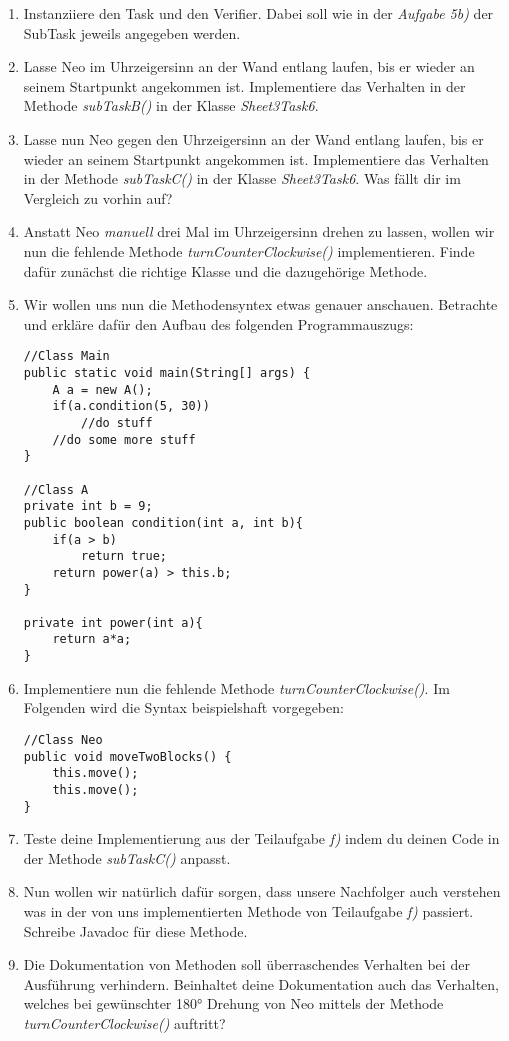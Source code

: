 
\begin{enumerate}[label=\alph*)]
    \item Instanziiere den Task und den Verifier. Dabei soll wie in der \textit{Aufgabe 5b)} der SubTask jeweils angegeben werden.
    \item Lasse Neo im Uhrzeigersinn an der Wand entlang laufen, bis er wieder an seinem Startpunkt angekommen ist.
    Implementiere das Verhalten in der Methode \textit{subTaskB()} in der Klasse \textit{Sheet3Task6}.
    \item Lasse nun Neo gegen den Uhrzeigersinn an der Wand entlang laufen, bis er wieder an seinem Startpunkt angekommen ist.
    Implementiere das Verhalten in der Methode \textit{subTaskC()} in der Klasse \textit{Sheet3Task6}.
    Was fällt dir im Vergleich zu vorhin auf?
    \item Anstatt Neo \textit{manuell} drei Mal im Uhrzeigersinn drehen zu lassen, wollen wir nun die fehlende Methode \textit{turnCounterClockwise()}
    implementieren. Finde dafür zunächst die richtige Klasse und die dazugehörige Methode.
    \item Wir wollen uns nun die Methodensyntex etwas genauer anschauen. Betrachte und erkläre dafür den Aufbau des folgenden Programmauszugs:
    \begin{lstlisting}
//Class Main
public static void main(String[] args) {
    A a = new A();
    if(a.condition(5, 30))
        //do stuff
    //do some more stuff
}

//Class A
private int b = 9;
public boolean condition(int a, int b){
    if(a > b)
        return true;
    return power(a) > this.b;
}

private int power(int a){
    return a*a;
}
    \end{lstlisting}
    \item Implementiere nun die fehlende Methode \textit{turnCounterClockwise()}. Im Folgenden wird die Syntax beispielshaft vorgegeben:
    \begin{lstlisting}
//Class Neo
public void moveTwoBlocks() {
    this.move();
    this.move();
}
    \end{lstlisting}
    \item Teste deine Implementierung aus der Teilaufgabe \textit{f)} indem du deinen Code in der Methode \textit{subTaskC()} anpasst.
    \item Nun wollen wir natürlich dafür sorgen, dass unsere Nachfolger auch verstehen was in der von uns implementierten Methode von 
    Teilaufgabe \textit{f)} passiert. Schreibe Javadoc für diese Methode.
    \item Die Dokumentation von Methoden soll überraschendes Verhalten bei der Ausführung verhindern. Beinhaltet deine Dokumentation auch 
    das Verhalten, welches bei gewünschter 180° Drehung von Neo mittels der Methode \textit{turnCounterClockwise()} auftritt?
\end{enumerate}